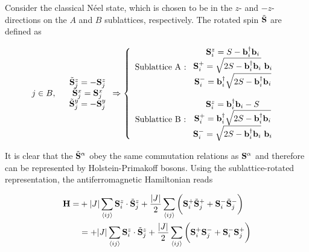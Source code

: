 \documentclass{homework}
\begin{document}
Consider the classical Néel state, which is chosen to be in the $z$- and $-z$-directions on the $A$ and $B$ sublattices, respectively. The rotated spin $\tilde{{\bf S}}$ are defined as 

\begin{equation}
    j \in B, \quad \begin{array}{c}
         \tilde{{\bf S}}_j^z = - {\bf S}_j^z  \\
         \tilde{{\bf S}}_j^x = {\bf S}_j^x \\
         \tilde{{\bf S}}_j^y = - {\bf S}_j^y 
    \end{array} \Rightarrow \left\{ \begin{array}{cc}
         \textnormal{Sublattice A : } \begin{array}{cc}
              {\bf S}^z_i = S - {\bf b}_i^\dagger {\bf b}_i  \\
              {\bf S}^+_i = \sqrt{2S - {\bf b}_i^\dagger {\bf b}_i} \textnormal{ } {\bf b}_i \\
              {\bf S}^-_i = {\bf b}_i^\dagger\sqrt{2S - {\bf b}_i^\dagger {\bf b}_i} 
         \end{array}\\
         \\
         \textnormal{Sublattice B : }  \begin{array}{cc}
              {\bf S}^z_i = {\bf b}_i^\dagger {\bf b}_i - S  \\
              {\bf S}^+_i = {\bf b}_i^\dagger\sqrt{2S - {\bf b}_i^\dagger {\bf b}_i} \\
              {\bf S}^-_i = \sqrt{2S - {\bf b}_i^\dagger {\bf b}_i} \textnormal{ } {\bf b}_i 
         \end{array}
    \end{array} \right.
\end{equation}

It is clear that the $\tilde{{\bf S}}^\alpha$ obey the same commutation relations as ${\bf S}^\alpha$ and therefore can be represented by Holstein-Primakoff bosons. Using the sublattice-rotated representation, the antiferromagnetic Hamiltonian reads

\begin{equation}
\begin{split}
    {\bf H} =& + |J| \sum_{\langle ij \rangle} {\bf S}_i^z \cdot \tilde{{\bf S}}_j^z + \frac{|J|}{2} \sum_{\langle ij \rangle} \bigg( {\bf S}_i^+ \tilde{{\bf S}}_j^+ + {\bf S}_i^- \tilde{{\bf S}}_j^- \bigg) \\
    &= + |J| \sum_{\langle ij \rangle} {\bf S}_i^z \cdot \tilde{{\bf S}}_j^z + \frac{|J|}{2} \sum_{\langle ij \rangle} \bigg( {\bf S}_i^+ {{\bf S}}_j^- + {\bf S}_i^- {{\bf S}}_j^+ \bigg) 
\end{split}
\end{equation}
\end{document}
